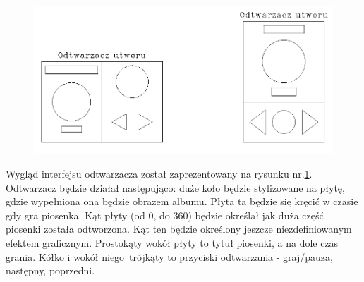 \begin{figure}[H]
	\centering
	\includegraphics[width=1\linewidth]{images/mockup2_odtwarzacz}
	\caption{}
	\label{fig:mockup2odtwarzacz}
\end{figure}

Wygląd interfejsu odtwarzacza został zaprezentowany na rysunku nr.\ref{fig:mockup2odtwarzacz}. Odtwarzacz będzie działał następująco: duże koło będzie stylizowane na płytę, gdzie wypełniona ona będzie obrazem albumu. Płyta ta będzie się kręcić w czasie gdy gra piosenka. Kąt płyty (od 0\degree, do 360\degree) będzie określał jak duża część piosenki została odtworzona. Kąt ten będzie określony jeszcze niezdefiniowanym efektem graficznym. Prostokąty wokół płyty to tytuł piosenki, a na dole czas grania. Kółko i wokół niego trójkąty to przyciski odtwarzania - graj/pauza, następny, poprzedni.
